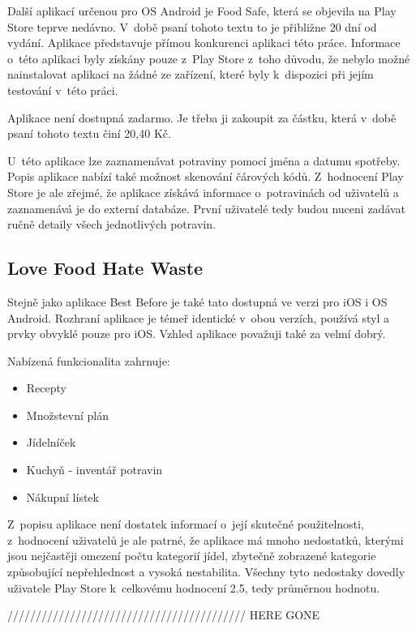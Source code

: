\documentclass[thesis=B,czech]{FITthesis}[2013/10/20]
\begin{document}
Další aplikací určenou pro OS Android je Food Safe, která se objevila na Play Store teprve nedávno. V~době psaní tohoto textu to je přibližne 20 dní od vydání. Aplikace představuje přímou konkurenci aplikaci této práce. Informace o~této aplikaci byly získány pouze z~Play Store z~toho důvodu, že nebylo možné nainstalovat aplikaci na žádné ze zařízení, které byly k~dispozici při jejím testování v~této práci. 

Aplikace není dostupná zadarmo. Je třeba ji zakoupit za částku, která v~době psaní tohoto textu činí 20,40 Kč.

U~této aplikace lze zaznamenávat potraviny pomocí jména a datumu spotřeby. Popis aplikace nabízí také možnost skenování čárových kódů. Z~hodnocení Play Store je ale zřejmé, že aplikace získává informace o~potravinách od uživatelů a zaznamenává je do externí databáze. První uživatelé tedy budou nuceni zadávat ručně detaily všech jednotlivých potravin.

\subsection{Love Food Hate Waste}

Stejně jako aplikace Best Before je také tato dostupná ve verzi pro iOS i OS Android. Rozhraní aplikace je témeř identické v~obou verzích, používá styl a prvky obvyklé pouze pro iOS. Vzhled aplikace považuji také za velmí dobrý.

Nabízená funkcionalita zahrnuje:
\begin{itemize}
  \item{Recepty}
  \item{Množstevní plán}
  \item{Jídelníček}
  \item{Kuchyň - inventář potravin}
  \item{Nákupní lístek}
\end{itemize}

Z~popisu aplikace není dostatek informací o~její skutečné použitelnosti, z~hodnocení uživatelů je ale patrné, že aplikace má mnoho nedostatků, kterými jsou nejčastěji omezení počtu kategorií jídel, zbytečně zobrazené kategorie způsobující nepřehlednost a vysoká nestabilita. Všechny tyto nedostaky dovedly uživatele Play Store k~celkovému hodnocení 2.5, tedy průměrnou hodnotu.








////////////////////////////////////////// HERE GONE
\end{document}
